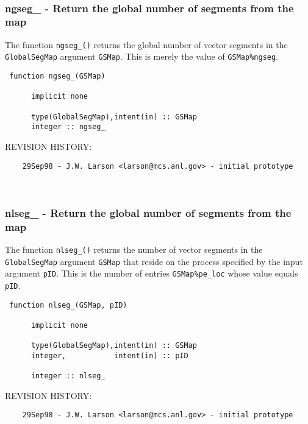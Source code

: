  
\mbox{}\hrulefill\ 
 

 \subsubsection{ngseg\_ - Return the global number of segments from the map}


 
  The function {\tt ngseg\_()} returns the global number of vector
  segments in the {\tt GlobalSegMap} argument {\tt GSMap}.  This is
  merely the value of {\tt GSMap\%ngseg}.
 
\begin{verbatim} 
 function ngseg_(GSMap)
 
      implicit none
 
      type(GlobalSegMap),intent(in) :: GSMap
      integer :: ngseg_
 \end{verbatim}{\sf REVISION HISTORY:}
\begin{verbatim}  	29Sep98 - J.W. Larson <larson@mcs.anl.gov> - initial prototype\end{verbatim}
 
 
\mbox{}\hrulefill\ 
 

 \subsubsection{nlseg\_ - Return the global number of segments from the map}


 
  The function {\tt nlseg\_()} returns the number of vector segments 
  in the {\tt GlobalSegMap} argument {\tt GSMap} that reside on the 
  process specified by the input argument {\tt pID}.  This is the 
  number of entries {\tt GSMap\%pe\_loc} whose value equals {\tt pID}.
 
\begin{verbatim} 
 function nlseg_(GSMap, pID)
 
      implicit none
 
      type(GlobalSegMap),intent(in) :: GSMap
      integer,           intent(in) :: pID
 
      integer :: nlseg_
 \end{verbatim}{\sf REVISION HISTORY:}
\begin{verbatim}  	29Sep98 - J.W. Larson <larson@mcs.anl.gov> - initial prototype\end{verbatim}
 
